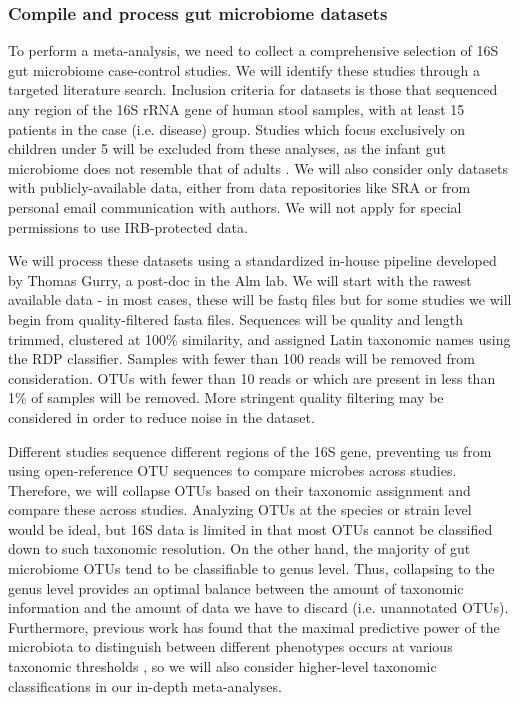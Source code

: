 \documentclass[12pt]{article}
\begin{document}
\subsubsection{Compile and process gut microbiome datasets}
To perform a meta-analysis, we need to collect a 
comprehensive selection of 16S gut microbiome case-control studies. We 
will identify these studies through a targeted literature search.  
Inclusion criteria for datasets is those that sequenced
any region of the 16S rRNA gene of human stool samples, with at least 15 patients in the
case (i.e. disease) group. Studies which focus exclusively on 
children under 5 will be excluded from these analyses, as the infant
gut microbiome does not resemble that of adults \cite{lozupone-meta-2013}.
We will also consider only datasets with 
publicly-available data, either from data repositories like SRA or
from personal email communication with authors. We will not 
apply for special permissions to use IRB-protected data. 

We will process these datasets using a standardized in-house pipeline 
developed by Thomas Gurry, a post-doc in the Alm lab. We will 
start with the rawest available data - in most cases, these will be 
fastq files but for some studies we will begin from quality-filtered 
fasta files. Sequences will be quality and length trimmed, clustered 
at 100\% similarity, and assigned Latin taxonomic names using the RDP 
classifier. Samples with fewer than 100 reads will be removed from 
consideration. OTUs with fewer than 10 reads or which are present in 
less than 1\% of samples will be removed. More stringent quality 
filtering may be considered in order to reduce noise in the dataset.

Different studies sequence different regions of the 16S gene,
preventing us from using open-reference OTU sequences to compare
microbes across studies. Therefore, we will collapse OTUs
based on their taxonomic assignment and compare these across studies.
Analyzing OTUs at the species or strain level would be ideal,
but 16S data is limited in that most OTUs cannot be classified
down to such taxonomic resolution. On the other hand, the majority of gut microbiome
OTUs tend to be classifiable to genus level. Thus, collapsing to the genus level 
provides an optimal balance between the amount of taxonomic information and the 
amount of data we have to discard (i.e. unannotated OTUs).
Furthermore, previous work has found that the maximal predictive power of the microbiota
to distinguish between different phenotypes
occurs at various taxonomic thresholds \cite{knights-biomarkers-2011}, so we will
also consider higher-level taxonomic classifications in our in-depth meta-analyses.
\end{document}
